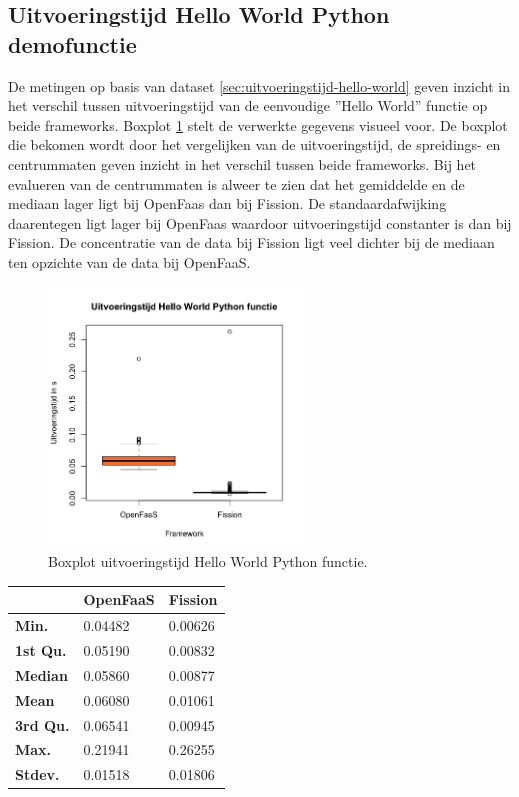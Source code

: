 \subsection{Uitvoeringstijd Hello World Python demofunctie}
De metingen op basis van dataset \ref{sec:uitvoeringstijd-hello-world} geven inzicht in het verschil tussen uitvoeringstijd van de eenvoudige ''Hello World'' functie op beide frameworks. Boxplot \ref{fig:boxplot-hello-functie} stelt de verwerkte gegevens visueel voor.
De boxplot die bekomen wordt door het vergelijken van de uitvoeringstijd, de spreidings- en centrummaten geven inzicht in het verschil tussen beide frameworks. Bij het evalueren van de centrummaten is alweer te zien dat het gemiddelde en de mediaan lager ligt bij OpenFaas dan bij Fission. De standaardafwijking daarentegen ligt lager bij OpenFaas waardoor uitvoeringstijd constanter is dan bij Fission. De concentratie van de data bij Fission ligt veel dichter bij de mediaan ten opzichte van de data bij OpenFaaS.
\begin{figure}
    \centering
    \includegraphics[width=0.6\textwidth]{img/boxplot-uitvoeringstijd-hellofunctie.png}
    \caption{Boxplot uitvoeringstijd Hello World Python functie.}
    \label{fig:boxplot-hello-functie}
\end{figure}

\begin{tabular}{@{}lll@{}}
    \toprule
    & \textbf{OpenFaaS} & \textbf{Fission} \\ \midrule
    \textbf{Min.} & 0.04482 & 0.00626 \\
    \textbf{1st Qu.} & 0.05190 & 0.00832 \\
    \textbf{Median} & 0.05860 & 0.00877 \\
    \textbf{Mean} & 0.06080 & 0.01061 \\
    \textbf{3rd Qu.} & 0.06541 & 0.00945 \\
    \textbf{Max.} & 0.21941 & 0.26255 \\
    \textbf{Stdev.} & 0.01518 & 0.01806 \\ \bottomrule
\end{tabular}

